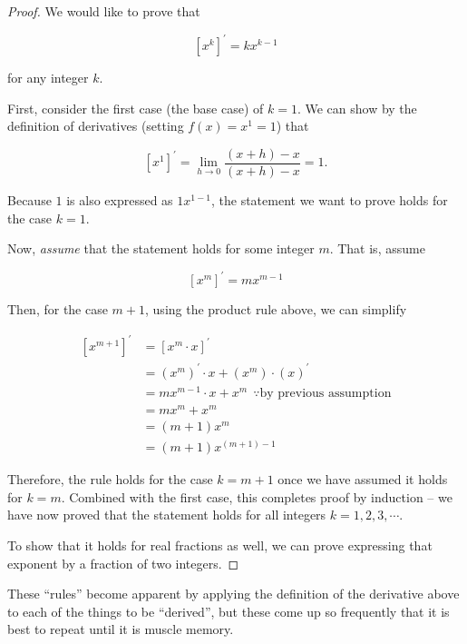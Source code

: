 \documentclass[
  letterpaper,
]{book}
\theoremstyle{definition}
\theoremstyle{definition}
\theoremstyle{plain}
\theoremstyle{definition}
\theoremstyle{plain}
\theoremstyle{plain}
\theoremstyle{remark}
\begin{document}
\begin{proof}

We would like to prove that

\[\left[x^k\right]^\prime = k x^{k-1}\]

for any integer \(k\).

First, consider the first case (the base case) of \(k = 1\). We can show
by the definition of derivatives (setting \(f(x) = x^1 = 1\)) that

\[[x^1]^\prime = \lim_{h \rightarrow 0}\frac{(x + h) - x}{(x + h) - x}= 1.\]

Because \(1\) is also expressed as \(1 x^{1- 1}\), the statement we want
to prove holds for the case \(k =1\).

Now, \emph{assume} that the statement holds for some integer \(m\). That
is, assume

\[\left[x^m\right]^\prime = m x^{m-1}\]

Then, for the case \(m + 1\), using the product rule above, we can
simplify

\[\begin{align*}
  \left[x^{m + 1}\right]^\prime &= [x^{m}\cdot x]^\prime\\
  &= (x^m)^\prime\cdot x + (x^m)\cdot (x)^\prime\\
  &= m x^{m - 1}\cdot x + x^m ~~\because \text{by previous assumption}\\
  &= mx^m + x^m\\
  &= (m + 1)x^m\\
  &= (m + 1)x^{(m + 1) - 1}
  \end{align*}\]

Therefore, the rule holds for the case \(k = m + 1\) once we have
assumed it holds for \(k = m\). Combined with the first case, this
completes proof by induction -- we have now proved that the statement
holds for all integers \(k = 1, 2, 3, \cdots\).

To show that it holds for real fractions as well, we can prove
expressing that exponent by a fraction of two integers.

\end{proof}

These ``rules'' become apparent by applying the definition of the
derivative above to each of the things to be ``derived'', but these come
up so frequently that it is best to repeat until it is muscle memory.
\end{document}
